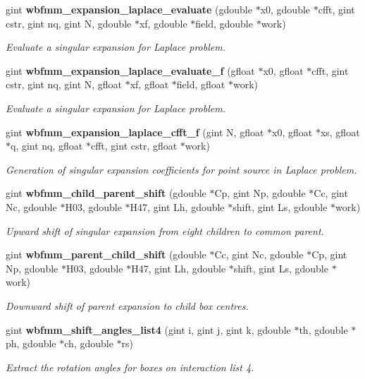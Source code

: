 \begin{DoxyCompactItemize}
gint {\bf wbfmm\+\_\+expansion\+\_\+laplace\+\_\+evaluate} (gdouble $\ast$x0, gdouble $\ast$cfft, gint cstr, gint nq, gint N, gdouble $\ast$xf, gdouble $\ast$field, gdouble $\ast$work)
\begin{DoxyCompactList}\small\item\em Evaluate a singular expansion for Laplace problem. \end{DoxyCompactList}\item 
gint {\bf wbfmm\+\_\+expansion\+\_\+laplace\+\_\+evaluate\+\_\+f} (gfloat $\ast$x0, gfloat $\ast$cfft, gint cstr, gint nq, gint N, gfloat $\ast$xf, gfloat $\ast$field, gfloat $\ast$work)
\begin{DoxyCompactList}\small\item\em Evaluate a singular expansion for Laplace problem. \end{DoxyCompactList}\item 
gint {\bf wbfmm\+\_\+expansion\+\_\+laplace\+\_\+cfft\+\_\+f} (gint N, gfloat $\ast$x0, gfloat $\ast$xs, gfloat $\ast$q, gint nq, gfloat $\ast$cfft, gint cstr, gfloat $\ast$work)
\begin{DoxyCompactList}\small\item\em Generation of singular expansion coefficients for point source in Laplace problem. \end{DoxyCompactList}\item 
gint {\bf wbfmm\+\_\+child\+\_\+parent\+\_\+shift} (gdouble $\ast$Cp, gint Np, gdouble $\ast$Cc, gint Nc, gdouble $\ast$H03, gdouble $\ast$H47, gint Lh, gdouble $\ast$shift, gint Ls, gdouble $\ast$work)
\begin{DoxyCompactList}\small\item\em Upward shift of singular expansion from eight children to common parent. \end{DoxyCompactList}\item 
gint {\bf wbfmm\+\_\+parent\+\_\+child\+\_\+shift} (gdouble $\ast$Cc, gint Nc, gdouble $\ast$Cp, gint Np, gdouble $\ast$H03, gdouble $\ast$H47, gint Lh, gdouble $\ast$shift, gint Ls, gdouble $\ast$work)
\begin{DoxyCompactList}\small\item\em Downward shift of parent expansion to child box centres. \end{DoxyCompactList}\item 
gint {\bf wbfmm\+\_\+shift\+\_\+angles\+\_\+list4} (gint i, gint j, gint k, gdouble $\ast$th, gdouble $\ast$ph, gdouble $\ast$ch, gdouble $\ast$rs)
\begin{DoxyCompactList}\small\item\em Extract the rotation angles for boxes on interaction list 4. \end{DoxyCompactList}\item 

\end{DoxyCompactItemize}

